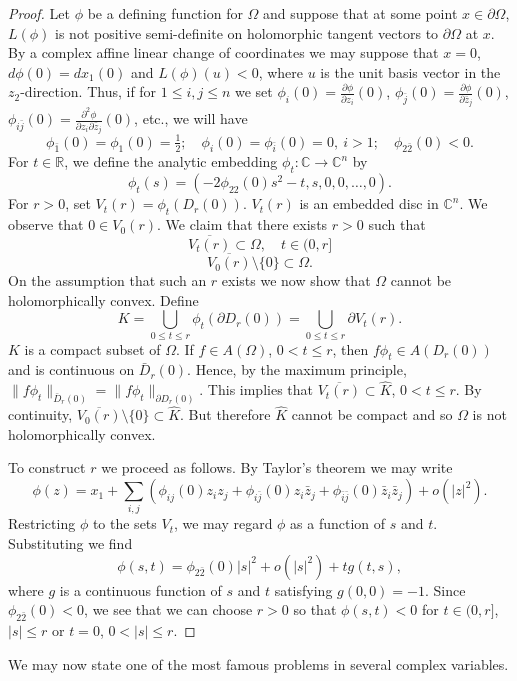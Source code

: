 \begin{proof}
Let $\phi$ be a defining function for $\Omega$ and suppose that at some point $x\in\partial\Omega$, $L(\phi)$ is not positive semi-definite on holomorphic tangent vectors to $\partial\Omega$ at $x$. By a complex affine linear change of coordinates
we may suppose that $x=0$, $d\phi(0)=dx_1(0)$ and $L(\phi)(u)<0$, where $u$ is the unit basis vector in the $z_2$-direction. Thus, if for $1\leq i,j\leq n$ we set $\phi_i(0)=\frac{\partial\phi}{\partial z_i}(0)$, $\phi_{\bar j}(0)=\frac{\partial\phi}{\partial\bar z_j}(0)$, $\phi_{i\bar j}(0)=\frac{\partial^2\phi}{\partial z_i\partial\bar z_j}(0)$, etc., we will have
\[\phi_{\bar1}(0)=\phi_1(0)=\tfrac12;\quad\phi_i(0)=\phi_{\bar i}(0)=0,\ i>1;\quad\phi_{2\bar2}(0)<0.\]
For $t\in\mathbb R$, we define the analytic embedding $\phi_t:\mathbb C\to\mathbb C^n$ by
\[\phi_t(s)=(-2\phi_{22}(0)s^2-t,s,0,0,\ldots,0).\]
For $r>0$, set $V_t(r)=\phi_t(D_r(0))$. $V_t(r)$ is an embedded disc in $\mathbb C^n$. We observe that $0\in V_0(r)$. We claim that there exists $r>0$ such that
\[\overline{V_t(r)}\subset\Omega,\quad t\in(0,r]\]
\[\overline{V_0(r)}\setminus\{0\}\subset\Omega.\]
On the assumption that such an $r$ exists we now show that $\Omega$ cannot be holomorphically convex. Define
\[K=\bigcup_{0\leq t\leq r}\phi_t(\partial D_r(0))=\bigcup_{0\leq t\leq r}\partial V_t(r).\]
$K$ is a compact subset of $\Omega$. If $f\in A(\Omega)$, $0<t\leq r$, then $f\phi_t\in A(D_r(0))$ and is continuous on $\bar D_r(0)$. Hence, by the maximum principle, $\|f\phi_t\|_{\bar D_r(0)}=\|f\phi_t\|_{\partial D_r(0)}$. This implies that $\overline{V_t(r)}\subset\widehat K$, $0<t\leq r$. By continuity, $\overline{V_0(r)}\setminus\{0\}\subset\widehat K$. But therefore $\widehat K$ cannot be compact and so $\Omega$ is not holomorphically convex.

To construct $r$ we proceed as follows. By Taylor's theorem we may write
\[\phi(z)=x_1+\sum_{i,j}(\phi_{ij}(0)z_i z_j+\phi_{i\bar j}(0)z_i\bar z_j+\phi_{\bar i\bar j}(0)\bar z_i\bar z_j)+o(|z|^2).\]
Restricting $\phi$ to the sets $V_t$, we may regard $\phi$ as a function of $s$ and $t$. Substituting we find
\[\phi(s,t)=\phi_{2\bar2}(0)|s|^2+o(|s|^2)+tg(t,s),\]
where $g$ is a continuous function of $s$ and $t$ satisfying $g(0,0)=-1$. Since $\phi_{2\bar2}(0)<0$, we see that we can choose $r>0$ so that $\phi(s,t)<0$ for $t\in(0,r]$, $|s|\leq r$ or $t=0$, $0<|s|\leq r$.
\end{proof}
We may now state one of the most famous problems in several complex variables.
